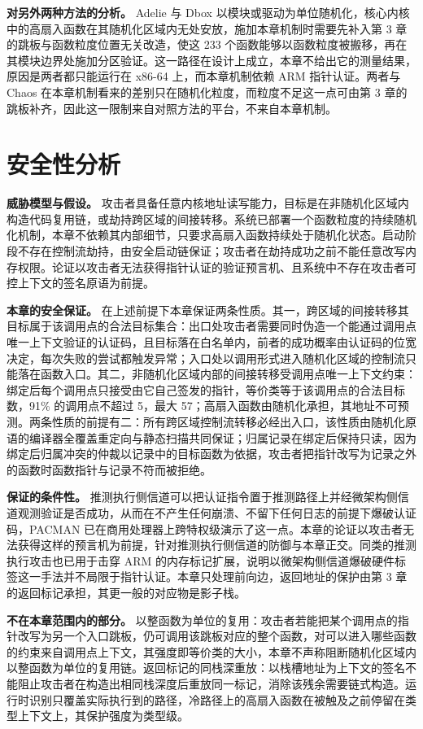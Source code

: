 \textbf{对另外两种方法的分析。} Adelie 与 Dbox 以模块或驱动为单位随机化，核心内核中的高扇入函数在其随机化区域内无处安放，施加本章机制时需要先补入第 3 章的跳板与函数粒度位置无关改造，使这 233 个函数能够以函数粒度被搬移，再在其模块边界处施加分区验证。这一路径在设计上成立，本章不给出它的测量结果，原因是两者都只能运行在 x86-64 上，而本章机制依赖 ARM 指针认证。两者与 Chaos 在本章机制看来的差别只在随机化粒度，而粒度不足这一点可由第 3 章的跳板补齐，因此这一限制来自对照方法的平台，不来自本章机制。

\section{安全性分析}

\textbf{威胁模型与假设。} 攻击者具备任意内核地址读写能力，目标是在非随机化区域内构造代码复用链，或劫持跨区域的间接转移。系统已部署一个函数粒度的持续随机化机制，本章不依赖其内部细节，只要求高扇入函数持续处于随机化状态。启动阶段不存在控制流劫持，由安全启动链保证；攻击者在劫持成功之前不能任意改写内存权限。论证以攻击者无法获得指针认证的验证预言机、且系统中不存在攻击者可控上下文的签名原语为前提。

\textbf{本章的安全保证。} 在上述前提下本章保证两条性质。其一，跨区域的间接转移其目标属于该调用点的合法目标集合：出口处攻击者需要同时伪造一个能通过调用点唯一上下文验证的认证码，且目标落在白名单内，前者的成功概率由认证码的位宽决定，每次失败的尝试都触发异常；入口处以调用形式进入随机化区域的控制流只能落在函数入口。其二，非随机化区域内部的间接转移受调用点唯一上下文约束：绑定后每个调用点只接受由它自己签发的指针，等价类等于该调用点的合法目标数，91\% 的调用点不超过 5，最大 57；高扇入函数由随机化承担，其地址不可预测。两条性质的前提有二：所有跨区域控制流转移必经出入口，该性质由随机化原语的编译器全覆盖重定向与静态扫描共同保证；归属记录在绑定后保持只读，因为绑定后归属冲突的仲裁以记录中的目标函数为依据，攻击者把指针改写为记录之外的函数时函数指针与记录不符而被拒绝。

\textbf{保证的条件性。} 推测执行侧信道可以把认证指令置于推测路径上并经微架构侧信道观测验证是否成功，从而在不产生任何崩溃、不留下任何日志的前提下爆破认证码，PACMAN\citep{ravichandran2022pacman} 已在商用处理器上跨特权级演示了这一点。本章的论证以攻击者无法获得这样的预言机为前提，针对推测执行侧信道的防御与本章正交。同类的推测执行攻击也已用于击穿 ARM 的内存标记扩展\citep{kim2024tiktag}，说明以微架构侧信道爆破硬件标签这一手法并不局限于指针认证。本章只处理前向边，返回地址的保护由第 3 章的返回标记承担，其更一般的对应物是影子栈\citep{burow2019shadow}。

\textbf{不在本章范围内的部分。} 以整函数为单位的复用：攻击者若能把某个调用点的指针改写为另一个入口跳板，仍可调用该跳板对应的整个函数，对可以进入哪些函数的约束来自调用点上下文，其强度即等价类的大小，本章不声称阻断随机化区域内以整函数为单位的复用链。返回标记的同栈深重放：以栈槽地址为上下文的签名不能阻止攻击者在构造出相同栈深度后重放同一标记，消除该残余需要链式构造。运行时识别只覆盖实际执行到的路径，冷路径上的高扇入函数在被触及之前停留在类型上下文上，其保护强度为类型级。

